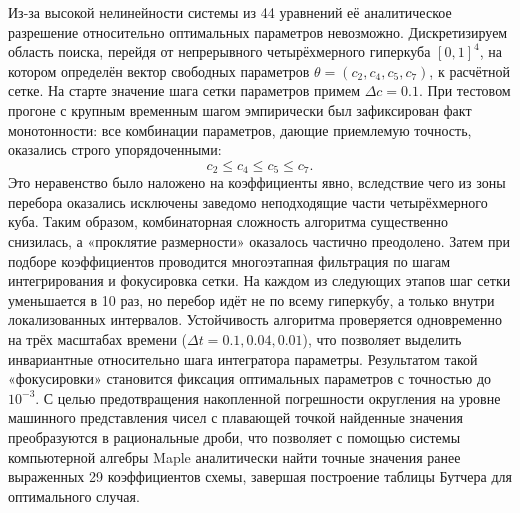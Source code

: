 Из-за высокой нелинейности системы из 44 уравнений её аналитическое разрешение относительно оптимальных параметров невозможно. Дискретизируем область поиска, перейдя от непрерывного четырёхмерного гиперкуба $[0, 1]^4$, на котором определён вектор свободных параметров $\theta = (c_2, c_4, c_5, c_7)$, к расчётной сетке. На старте значение шага сетки параметров примем $\Delta c = 0.1$. 
При тестовом прогоне с крупным временным шагом эмпирически был зафиксирован факт монотонности: все комбинации параметров, дающие приемлемую точность, оказались строго упорядоченными: 
\begin{equation}
	\label{eq:monotony}
	c_2 \leqslant c_4 \leqslant c_5 \leqslant c_7.
\end{equation}
Это неравенство было наложено на коэффициенты явно, вследствие чего из зоны перебора оказались исключены заведомо неподходящие части четырёхмерного куба. Таким образом, комбинаторная сложность алгоритма существенно снизилась, а «проклятие размерности» оказалось частично преодолено.
Затем при подборе коэффициентов проводится многоэтапная фильтрация по шагам интегрирования и фокусировка сетки. На каждом из следующих этапов шаг сетки уменьшается в 10 раз, но перебор идёт не по всему гиперкубу, а только внутри локализованных интервалов. Устойчивость алгоритма проверяется одновременно на трёх масштабах времени ($\Delta t = 0.1, 0.04, 0.01$), что позволяет выделить инвариантные относительно шага интегратора параметры.
Результатом такой «фокусировки» становится фиксация оптимальных параметров с точностью до $10^{-3}$. С целью предотвращения накопленной погрешности округления на уровне машинного представления чисел с плавающей точкой найденные значения преобразуются в рациональные дроби, что позволяет с помощью системы компьютерной алгебры Maple аналитически найти точные значения ранее выраженных 29 коэффициентов схемы, завершая построение таблицы Бутчера для оптимального случая.

